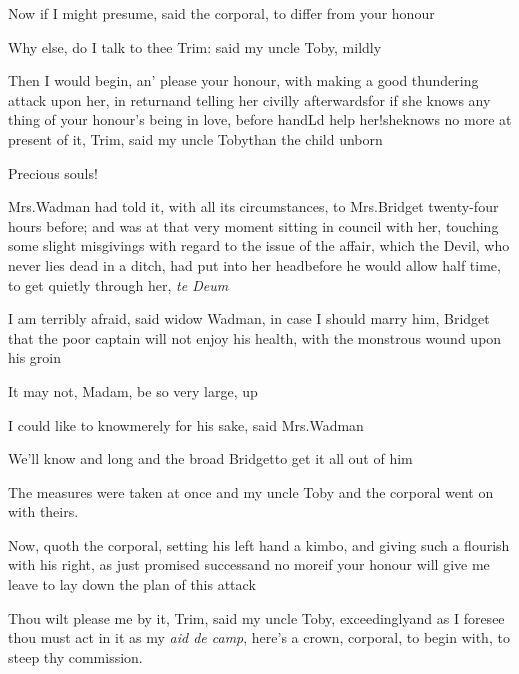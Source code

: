 \documentclass{article}
\begin{document}
Now if I might presume, said the corporal, to differ from your
honour\tsh

\tsh Why else, do I talk to thee Trim: said my uncle
Toby, mildly\tsh

\tsh Then I would begin, an’ please your honour, with
making a good thundering attack upon her, in return\tsk and
telling her civilly afterwards\tsk for if she knows any thing of
your honour’s being in love, before
hand\tsh L\tsk d help her!\tsk she\break knows no more at
present of it, Trim, said my uncle Toby\tsk than
the child\break
unborn\tsh

Precious souls!\tsh

Mrs.\@ Wadman had told it, with all its circumstances, to
Mrs.\@ Bridget twenty-four hours before; and was at that very\break
moment sitting in council with her, touching some slight misgivings
with regard to the issue of the affair, which the Devil, who never
lies dead in a ditch, had put into her head\tsk before he would
allow half time, to get quietly through her, \textit{te Deum}\tsh

I am terribly afraid, said widow Wadman, in case I should
marry him, Bridget
\tsk that the poor captain will not enjoy his
health, with the monstrous wound upon his groin\tsh

It may not, Madam, be so very large, 
up\tsh

\tsh I could like to know\tsk merely for his sake,
said Mrs.\@ Wadman\tsh

\tsk We’ll know and long and the broad
Bridget\tsk to get it all out of him\tsh

The measures were taken at once\tsh\break
and my uncle Toby and the corporal\break 
went on with theirs.\etp

\vfill{}\eject

Now, quoth the corporal, setting his left hand a kimbo, and
giving such a flourish with his right, as just promised
success\tsk and no more\tsh if your honour will give me
leave to lay down the plan of this attack\tsh

\tsh Thou wilt please me by it, Trim, said my
uncle Toby, exceedingly\tsk and as I foresee thou must act
in it as my \textit{aid de camp}, here’s a crown, corporal, to
begin with, to steep thy commission.
\end{document}
